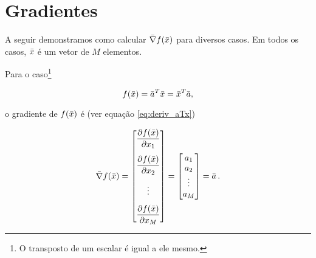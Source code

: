 \section{Gradientes}

A seguir demonstramos como calcular $\bar{\nabla}f(\bar{x})$
para diversos casos.
Em todos os casos, $\bar{x}$ é um vetor de $M$ elementos.

\begin{example}
    Para o caso\footnote{O transposto de um escalar é igual a ele mesmo.}

    \begin{equation}
    f(\bar{x}) = \bar{a}^T\bar{x} = \bar{x}^T\bar{a},
    \end{equation}
    
    \noindent o gradiente de $f(\bar{x})$ é (ver equação \ref{eq:deriv_aTx})
    
    \begin{equation}
    \vect{\nabla}f(\vect{x}) =
    \begin{bmatrix}
    \dfrac{\partial f(\vect{x})}{\partial x_1} \vspace{0.3cm}\\
    \dfrac{\partial f(\vect{x})}{\partial x_2} \vspace{0.3cm}\\
    \vdots \vspace{0.3cm}\\
    \dfrac{\partial f(\vect{x})}{\partial x_M}
    \end{bmatrix}
    =
    \begin{bmatrix}
    a_1 \\ a_2 \\ \vdots \\ a_M
    \end{bmatrix}
    = \vect{a}
    \thinspace .
    \end{equation}
\end{example}

